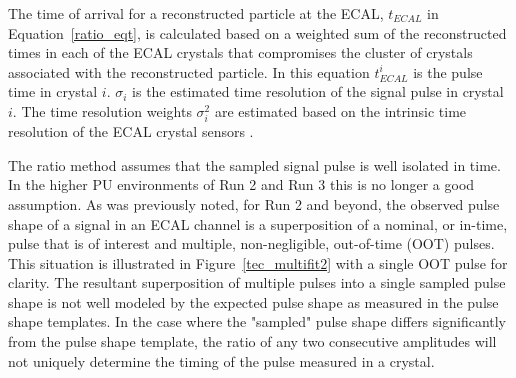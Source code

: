 The time of arrival for a reconstructed particle at the ECAL, $t_{ECAL}$ in Equation~\ref{ratio_eqt}, is calculated based on a weighted sum of the reconstructed times in each of the ECAL crystals that compromises the cluster of crystals associated with the reconstructed particle. In this equation $t^{i}_{ECAL}$ is the pulse time in crystal $i$. $\sigma_{i}$ is the estimated time resolution of the signal pulse in crystal $i$. The time resolution weights $\sigma^{2}_{i}$ are estimated based on the intrinsic time resolution of the ECAL crystal sensors \cite{Collaboration_2010}. 

The ratio method assumes that the sampled signal pulse is well isolated in time.  In the higher PU environments of Run 2 and Run 3 this is no longer a good assumption. As was previously noted, for Run 2 and beyond, the observed pulse shape of a signal in an ECAL channel is a superposition of a nominal, or in-time, pulse that is of interest and multiple, non-negligible, out-of-time (OOT) pulses. This situation is illustrated in Figure~\ref{tec_multifit2} with a single OOT pulse for clarity. The resultant superposition of multiple pulses into a single sampled pulse shape is not well modeled by the expected pulse shape as measured in the pulse shape templates. In the case where the "sampled" pulse shape differs significantly from the pulse shape template, the ratio of any two consecutive amplitudes will not uniquely determine the timing of the pulse measured in a crystal.
